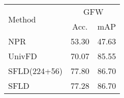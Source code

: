 
\begin{tabular}{lcc}
\toprule
\multirow[c]{2}{*}{Method} & \multicolumn{2}{c}{GFW\cite{borjiGFW}} \\
\cmidrule(lr){2-3}
 & Acc. & mAP \\
\midrule
NPR\cite{tan2024rethinking} & 53.30 & 47.63 \\
UnivFD\cite{ojha2023towards} & 70.07 & 85.55 \\
SFLD(224+56) & 77.80 & 86.70 \\
\rowcolor{Gray} SFLD & 77.28 & 86.70 \\
\bottomrule
\end{tabular}
